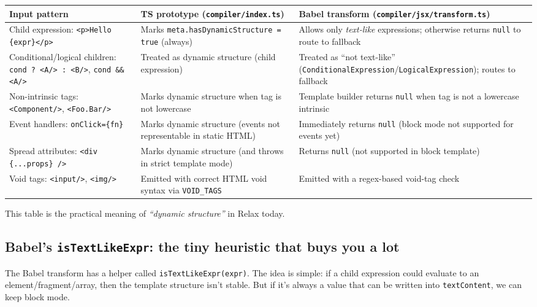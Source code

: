 \begin{center}
\begin{tabular}{|p{}|p{}|p{}|}
\hline
	\textbf{Input pattern} & \textbf{TS prototype (\texttt{compiler/index.ts})} & \textbf{Babel transform (\texttt{compiler/jsx/transform.ts})}\\
\hline
Child expression: \texttt{<p>Hello \{expr\}</p>} & Marks \texttt{meta.hasDynamicStructure = true} (always) & Allows only \emph{text-like} expressions; otherwise returns \texttt{null} to route to fallback \\
\hline
Conditional/logical children: \texttt{cond ? <A/> : <B/>}, \texttt{cond \&\& <A/>} & Treated as dynamic structure (child expression) & Treated as ``not text-like'' (\texttt{ConditionalExpression}/\texttt{LogicalExpression}); routes to fallback \\
\hline
Non-intrinsic tags: \texttt{<Component/>}, \texttt{<Foo.Bar/>} & Marks dynamic structure when tag is not lowercase & Template builder returns \texttt{null} when tag is not a lowercase intrinsic \\
\hline
Event handlers: \texttt{onClick=\{fn\}} & Marks dynamic structure (events not representable in static HTML) & Immediately returns \texttt{null} (block mode not supported for events yet) \\
\hline
Spread attributes: \texttt{<div \{...props\} />} & Marks dynamic structure (and throws in strict template mode) & Returns \texttt{null} (not supported in block template) \\
\hline
Void tags: \texttt{<input/>}, \texttt{<img/>} & Emitted with correct HTML void syntax via \texttt{VOID\_TAGS} & Emitted with a regex-based void-tag check \\
\hline
\end{tabular}
\end{center}

This table is the practical meaning of \emph{``dynamic structure''} in Relax today.

\subsection{Babel's \texttt{isTextLikeExpr}: the tiny heuristic that buys you a lot}

The Babel transform has a helper called \texttt{isTextLikeExpr(expr)}.
The idea is simple: if a child expression could evaluate to an element/fragment/array, then the template structure isn't stable.
But if it's always a value that can be written into \texttt{textContent}, we can keep block mode.


